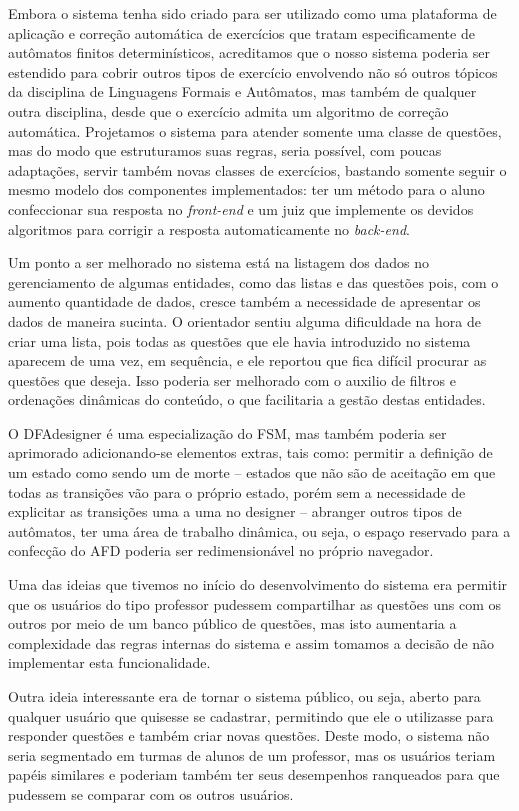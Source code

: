 \documentclass[
	12pt,				%
	openany,
	oneside,
	a4paper,			%
	english,			%
	brazil				%
	]{abntex2}
\begin{document}
  Embora o sistema tenha sido criado para ser utilizado como uma plataforma de aplicação e correção automática de exercícios que tratam especificamente de autômatos finitos determinísticos, acreditamos que o nosso sistema poderia ser estendido para cobrir outros tipos de exercício envolvendo não só outros tópicos da disciplina de Linguagens Formais e Autômatos, mas também de qualquer outra disciplina, desde que o exercício admita um algoritmo de correção automática. Projetamos o sistema para atender somente uma classe de questões, mas do modo que estruturamos suas regras, seria possível, com poucas adaptações, servir também novas classes de exercícios, bastando somente seguir o mesmo modelo dos componentes implementados: ter um método para o aluno confeccionar sua resposta no \textit{front-end} e um juiz que implemente os devidos algoritmos para corrigir a resposta automaticamente no \textit{back-end}.

  Um ponto a ser melhorado no sistema está na listagem dos dados no gerenciamento de algumas entidades, como das listas e das questões pois, com o aumento quantidade de dados, cresce também a necessidade de apresentar os dados de maneira sucinta. O orientador sentiu alguma dificuldade na hora de criar uma lista, pois todas as questões que ele havia introduzido no sistema aparecem de uma vez, em sequência, e ele reportou que fica difícil procurar as questões que deseja. Isso poderia ser melhorado com o auxilio de filtros e ordenações dinâmicas do conteúdo, o que facilitaria a gestão destas entidades. %

  O DFAdesigner é uma especialização do FSM, mas também poderia ser aprimorado adicionando-se elementos extras, tais como: permitir a definição de um estado como sendo um de morte -- estados que não são de aceitação em que todas as transições vão para o próprio estado, porém sem a necessidade de explicitar as transições uma a uma no designer -- abranger outros tipos de autômatos, ter uma área de trabalho dinâmica, ou seja, o espaço reservado para a confecção do AFD poderia ser redimensionável no próprio navegador.

  Uma das ideias que tivemos no início do desenvolvimento do sistema era permitir que os usuários do tipo professor pudessem compartilhar as questões uns com os outros por meio de um banco público de questões, mas isto aumentaria a complexidade das regras internas do sistema e assim tomamos a decisão de não implementar esta funcionalidade.

  Outra ideia interessante era de tornar o sistema público, ou seja, aberto para qualquer usuário que quisesse se cadastrar, permitindo que ele o utilizasse para responder questões e também criar novas questões. Deste modo, o sistema não seria segmentado em turmas de alunos de um professor, mas os usuários teriam papéis similares e poderiam também ter seus desempenhos ranqueados para que pudessem se comparar com os outros usuários.
  
\end{document}

